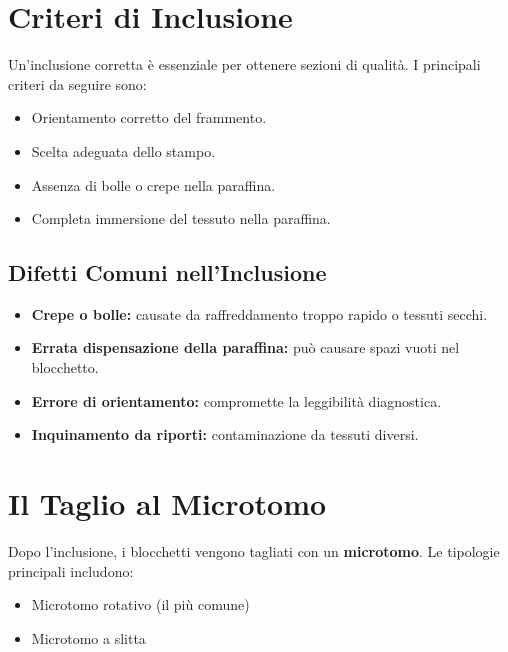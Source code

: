 \section{Criteri di Inclusione}

Un'inclusione corretta è essenziale per ottenere sezioni di qualità. I principali criteri da seguire sono:

\begin{itemize}
    \item Orientamento corretto del frammento.
    \item Scelta adeguata dello stampo.
    \item Assenza di bolle o crepe nella paraffina.
    \item Completa immersione del tessuto nella paraffina.
\end{itemize}


\subsection{Difetti Comuni nell'Inclusione}

\begin{itemize}
    \item \textbf{Crepe o bolle:} causate da raffreddamento troppo rapido o tessuti secchi.
    \item \textbf{Errata dispensazione della paraffina:} può causare spazi vuoti nel blocchetto.
    \item \textbf{Errore di orientamento:} compromette la leggibilità diagnostica.
    \item \textbf{Inquinamento da riporti:} contaminazione da tessuti diversi.
\end{itemize}

\section{Il Taglio al Microtomo}

Dopo l'inclusione, i blocchetti vengono tagliati con un \textbf{microtomo}. Le tipologie principali includono:

\begin{itemize}
    \item Microtomo rotativo (il più comune)
    \item Microtomo a slitta
\end{itemize}

